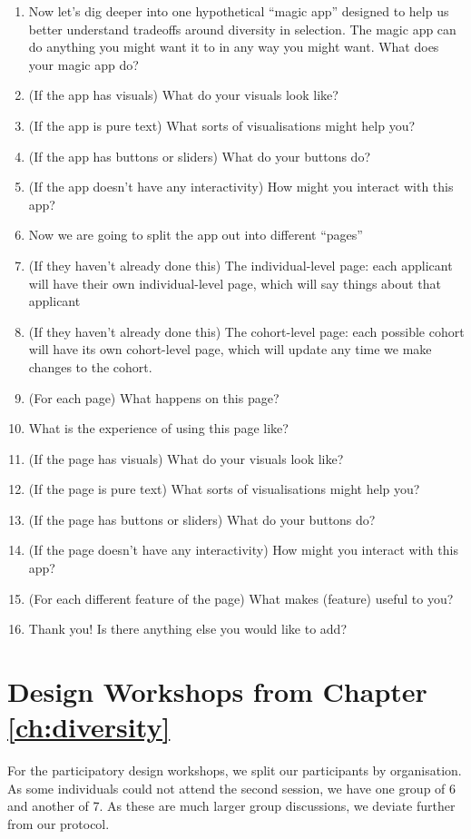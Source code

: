 \begin{enumerate}
    \item Now let's dig deeper into one hypothetical ``magic app'' designed to help us better understand tradeoffs around diversity in selection. The magic app can do anything you might want it to in any way you might want. What does your magic app do?
    \item (If the app has visuals) What do your visuals look like?
    \item (If the app is pure text) What sorts of visualisations might help you?
    \item (If the app has buttons or sliders) What do your buttons do?
    \item (If the app doesn't have any interactivity) How might you interact with this app?
    \item Now we are going to split the app out into different ``pages''
    \item (If they haven't already done this) The individual-level page: each applicant will have their own individual-level page, which will say things about that applicant
    \item (If they haven't already done this) The cohort-level page: each possible cohort will have its own cohort-level page, which will update any time we make changes to the cohort.
    \item (For each page) What happens on this page?
    \item What is the experience of using this page like?
    \item (If the page has visuals) What do your visuals look like?
    \item (If the page is pure text) What sorts of visualisations might help you?
    \item (If the page has buttons or sliders) What do your buttons do?
    \item (If the page doesn't have any interactivity) How might you interact with this app?
    \item (For each different feature of the page) What makes (feature) useful to you?
    \item Thank you! Is there anything else you would like to add?
\end{enumerate}

\section{Design Workshops from Chapter \ref{ch:diversity}}\label{app:divprotocol2}
For the participatory design workshops, we split our participants by organisation. As some individuals could not attend the second session, we have one group of 6 and another of 7. As these are much larger group discussions, we deviate further from our protocol.

